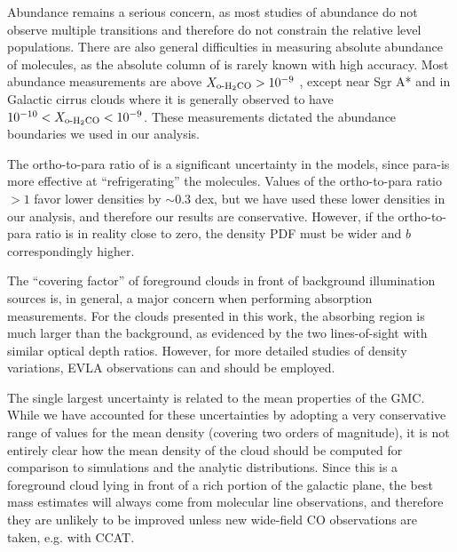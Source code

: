 Abundance remains a serious concern, as most studies of \ortho abundance
do not observe multiple transitions and therefore do not constrain the relative
level populations.  There
are also general difficulties in measuring absolute abundance of molecules, as
the absolute column of \hh is rarely known with high accuracy.  Most abundance
measurements are above $X_{\textrm{o-H}_2\textrm{CO}}>10^{-9}$
\citep{Dickens1999a,Liszt2006a}, 
except near Sgr A* \citep{Pauls1996a} and in Galactic cirrus clouds
\citep{Turner1989a,Turner1993a} where it is generally observed to have
$10^{-10}<X_{\textrm{o-H}_2\textrm{CO}}<10^{-9}$.  These measurements dictated the abundance
boundaries we used in our analysis.

The ortho-to-para ratio of \hh is a significant uncertainty in the models,
since para-\hh is more effective at ``refrigerating'' the \formaldehyde
molecules.  Values of the ortho-to-para ratio $>1$ favor lower densities by
$\sim0.3$ dex, but we have used these lower densities in our
analysis, and therefore our results are conservative.  However, if the
ortho-to-para ratio is in reality close to zero, the density PDF must be wider
and $b$ correspondingly higher.

The ``covering factor'' of foreground clouds in front of background
illumination sources is, in general, a major concern when performing absorption
measurements.  For the clouds presented in this work, the absorbing region
is much larger than the background, as evidenced by the two lines-of-sight with
similar optical depth ratios.  However, for more detailed studies of density
variations, EVLA observations can and should be employed.

The single largest uncertainty is related to the mean properties of the GMC.
While we have accounted for these uncertainties by adopting a very conservative
range of values for the mean density (covering two orders of magnitude), it is
not entirely clear how the mean density of the cloud should be computed for
comparison to simulations and the analytic distributions.  Since this is a
foreground cloud lying in front of a rich portion of the galactic plane, the
best mass estimates will always come from molecular line observations,
and therefore they are unlikely to be improved unless new wide-field CO
observations are taken, e.g. with CCAT.  

